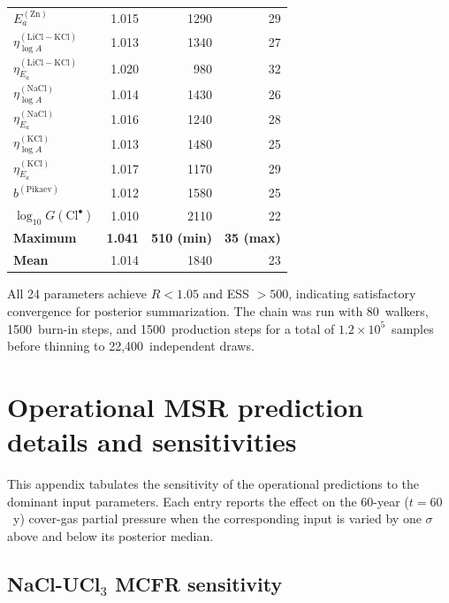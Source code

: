 \documentclass[11pt]{article}
\theoremstyle{plain}
\theoremstyle{definition}
\theoremstyle{remark}
\newcommand{\Ea}{E_a}
\begin{document}
\begin{table}[h!]
\begin{tabular}{lrrr}
$\Ea^{(\mathrm{Zn})}$           & 1.015 & 1290 & 29 \\
$\eta_{\log A}^{(\mathrm{LiCl-KCl})}$ & 1.013 & 1340 & 27 \\
$\eta_{\Ea}^{(\mathrm{LiCl-KCl})}$    & 1.020 &  980 & 32 \\
$\eta_{\log A}^{(\mathrm{NaCl})}$     & 1.014 & 1430 & 26 \\
$\eta_{\Ea}^{(\mathrm{NaCl})}$        & 1.016 & 1240 & 28 \\
$\eta_{\log A}^{(\mathrm{KCl})}$      & 1.013 & 1480 & 25 \\
$\eta_{\Ea}^{(\mathrm{KCl})}$         & 1.017 & 1170 & 29 \\
$b^{(\mathrm{Pikaev})}$               & 1.012 & 1580 & 25 \\
$\log_{10}\!G(\mathrm{Cl}^{\bullet})$ & 1.010 & 2110 & 22 \\
\midrule
\textbf{Maximum}    & \textbf{1.041} & \textbf{510 (min)} & \textbf{35 (max)} \\
\textbf{Mean}       & 1.014          & 1840              & 23 \\
\bottomrule
\end{tabular}
\end{table}

All 24 parameters achieve $\hat{R} < 1.05$ and ESS $> 500$, indicating
satisfactory convergence for posterior summarization.  The chain was run
with 80~walkers, 1500~burn-in steps, and 1500~production steps for a total
of $1.2 \times 10^5$~samples before thinning to 22{,}400~independent draws.

\section{Operational MSR prediction details and sensitivities}\label{app:sens}

This appendix tabulates the sensitivity of the operational predictions to
the dominant input parameters.  Each entry reports the effect on the
60-year ($t=60$~y) cover-gas partial pressure when the corresponding input
is varied by one $\sigma$ above and below its posterior median.

\subsection{NaCl-UCl$_3$ MCFR sensitivity}
\end{document}
